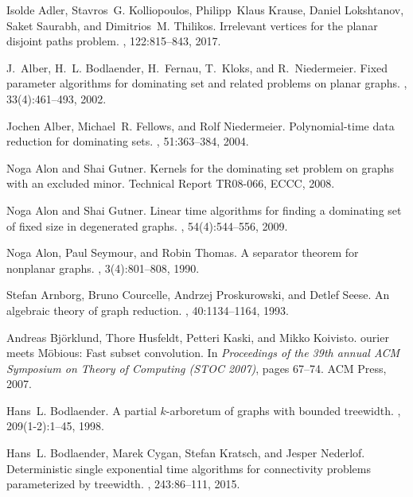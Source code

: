 \documentclass[11pt]{article}
\begin{document}
\begin{thebibliography}{10}

Isolde Adler, Stavros~G. Kolliopoulos, Philipp~Klaus Krause, Daniel Lokshtanov,
  Saket Saurabh, and Dimitrios~M. Thilikos.
\newblock Irrelevant vertices for the planar disjoint paths problem.
, 122:815--843, 2017.

J.~Alber, H.~L. Bodlaender, H.~Fernau, T.~Kloks, and R.~Niedermeier.
\newblock Fixed parameter algorithms for dominating set and related problems on
  planar graphs.
, 33(4):461--493, 2002.

Jochen Alber, Michael~R. Fellows, and Rolf Niedermeier.
\newblock Polynomial-time data reduction for dominating sets.
, 51:363--384, 2004.

Noga Alon and Shai Gutner.
\newblock Kernels for the dominating set problem on graphs with an excluded
  minor.
\newblock Technical Report TR08-066, ECCC, 2008.

Noga Alon and Shai Gutner.
\newblock Linear time algorithms for finding a dominating set of fixed size in
  degenerated graphs.
, 54(4):544--556, 2009.

Noga Alon, Paul Seymour, and Robin Thomas.
\newblock A separator theorem for nonplanar graphs.
, 3(4):801--808, 1990.

Stefan Arnborg, Bruno Courcelle, Andrzej Proskurowski, and Detlef Seese.
\newblock An algebraic theory of graph reduction.
, 40:1134--1164, 1993.

Andreas Bj\"{o}rklund, Thore Husfeldt, Petteri Kaski, and Mikko Koivisto.
ourier meets {M}\"{o}bious: Fast subset convolution.
\newblock In {\em Proceedings of the 39th annual ACM Symposium on Theory of
  Computing (STOC 2007)}, pages 67--74. ACM Press, 2007.

Hans~L. Bodlaender.
\newblock A partial {$k$}-arboretum of graphs with bounded treewidth.
, 209(1-2):1--45, 1998.

Hans~L. Bodlaender, Marek Cygan, Stefan Kratsch, and Jesper Nederlof.
\newblock Deterministic single exponential time algorithms for connectivity
  problems parameterized by treewidth.
, 243:86--111, 2015.


\end{thebibliography}
\end{document}

